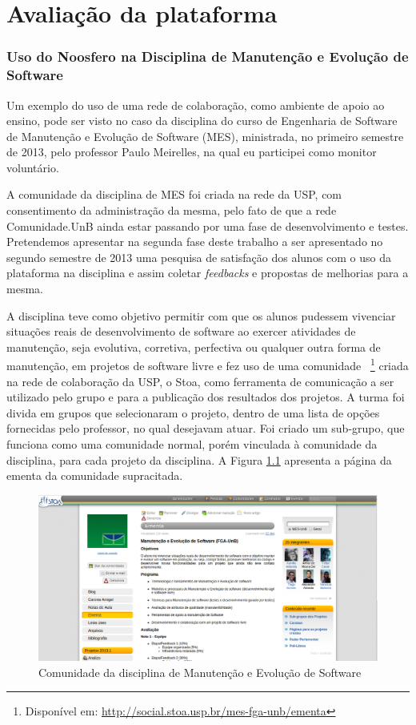 \chapter{Avaliação da plataforma}


\subsection{Uso do Noosfero na Disciplina de Manutenção e Evolução de Software}
\label{mes-unb}

Um exemplo do uso de uma rede de colaboração, como ambiente de apoio ao ensino,
pode ser visto no caso da disciplina do curso de Engenharia de Software de
Manutenção e Evolução de Software (MES), ministrada, no primeiro semestre de
2013, pelo professor Paulo Meirelles, na qual eu participei como monitor
voluntário.


A comunidade da disciplina de MES foi criada na rede da USP, com consentimento
da administração da mesma, pelo fato de que a rede Comunidade.UnB ainda estar
passando por uma fase de desenvolvimento e testes. Pretendemos apresentar
na segunda fase deste trabalho a ser apresentado no segundo semestre de 2013
uma pesquisa de satisfação dos alunos com o uso da plataforma na disciplina e
assim coletar \textit{feedbacks} e propostas de melhorias para a mesma. 

A disciplina teve como objetivo permitir com que os
alunos pudessem vivenciar situações reais de desenvolvimento de software ao
exercer atividades de manutenção, seja evolutiva, corretiva, perfectiva ou
qualquer outra forma de manutenção, em projetos de software livre e fez uso de
uma comunidade
~\footnote{Disponível em: \url{http://social.stoa.usp.br/mes-fga-unb/ementa}}
criada na rede de colaboração da USP, o Stoa, como ferramenta de comunicação a ser
utilizado pelo grupo e para a publicação dos resultados dos projetos.
%
A turma foi divida em grupos que selecionaram o projeto, dentro de uma lista
de opções fornecidas pelo professor, no qual desejavam atuar. Foi criado um 
sub-grupo, que funciona como uma comunidade normal, porém vinculada à comunidade
da disciplina, para cada projeto da disciplina. A Figura \ref{mes-unb}
apresenta a página da ementa da comunidade supracitada. 

\begin{figure}[h]
	\centering
	\includegraphics[keepaspectratio=true,scale=0.3]
	  {figuras/mes-unb.eps}
	\caption{Comunidade da disciplina de Manutenção e Evolução de Software}
	\label{mes-unb}
\end{figure}

